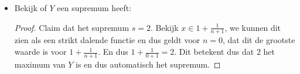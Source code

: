 \documentclass{article}
\newcommand{\f}[2]{\frac{#1}{#2}}
\newcommand{\tx}[1]{\text{#1}}
\begin{document}
\begin{enumerate}[label=\arabic*]
\begin{enumerate}[label=\alph*)]
\begin{enumerate}
\begin{itemize}
\begin{proof}
                                            Nu moeten we nog laten zien dat het de grootste ondergrens is.
                                            Voor alle $\epsilon > 0$, bestaat er een $x \in Y$ zodanig dat:
                                            \[\epsilon + \underbrace{1}_{\tx{Onze claim } i = 1} > x \]
                                            neem $x = 1 + \f{1}{n+1}$, dan:
                                            \[\epsilon + 1 > \f{1}{n+1} + 1\]
                                            We kunnen epsilon willekeurig klein maken en met name $\epsilon > \f{1}{n+1}$,
                                            en dus volgt dat $i = 1$ inderdaad het infimum is.
                                        \end{proof}
                                  \item Bekijk of $Y$ een supremum heeft:
                                        \begin{proof}
                                            Claim dat het supremum $s = 2$.
                                            Bekijk $x \in 1 + \f{1}{n+1}$, we kunnen dit zien als
                                            een strikt dalende functie en dus geldt voor $n=0$, dat
                                            dit de grootste waarde is voor $1 + \f{1}{n+1}$.
                                            En dus $1 + \f{1}{0+1} = 2$. Dit betekent dus dat $2$ het maximum van $Y$ is en dus
                                            automatisch het supremum.


                                        \end{proof}
                              \end{itemize}
                    \end{enumerate}
          \end{enumerate}
\end{enumerate}
\end{document}
